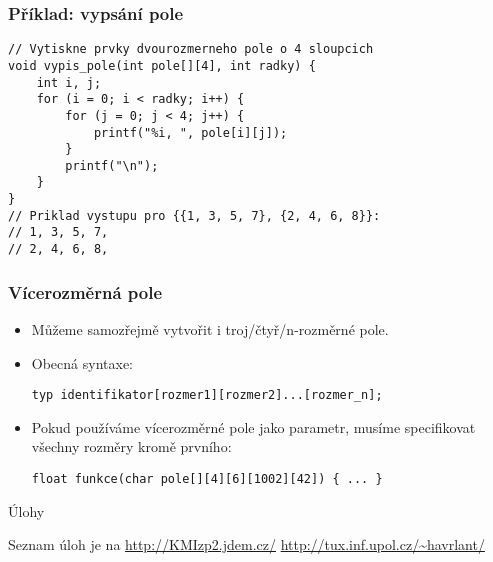 \documentclass{beamer}
\newenvironment{itemizex}%
  {\large \begin{itemize}%
    \setlength{\itemsep}{8pt}%
    \setlength{\parskip}{8pt}}%
  {\end{itemize}}
\begin{document}
\begin{frame}[t,fragile]\frametitle{Příklad: vypsání pole} 
\begin{verbatim} 
// Vytiskne prvky dvourozmerneho pole o 4 sloupcich
void vypis_pole(int pole[][4], int radky) {
    int i, j;
    for (i = 0; i < radky; i++) {
        for (j = 0; j < 4; j++) {
            printf("%i, ", pole[i][j]);
        }
        printf("\n");
    }
}
// Priklad vystupu pro {{1, 3, 5, 7}, {2, 4, 6, 8}}:
// 1, 3, 5, 7, 
// 2, 4, 6, 8, 
\end{verbatim}
\end{frame}



\begin{frame}[t,fragile]\frametitle{Vícerozměrná pole} 
    \vskip 1cm
    \begin{itemizex}
        \item Můžeme samozřejmě vytvořit i troj/čtyř/n-rozměrné pole.
        \item Obecná syntaxe:
\begin{verbatim} 
typ identifikator[rozmer1][rozmer2]...[rozmer_n];
\end{verbatim}
        \item Pokud používáme vícerozměrné pole jako parametr, musíme specifikovat všechny rozměry kromě prvního:
\begin{verbatim} 
float funkce(char pole[][4][6][1002][42]) { ... }
\end{verbatim}
    \end{itemizex}
\end{frame}


\begin{frame}[t,fragile]{Úlohy}
\begin{center}
\vskip 1cm
{\Large Seznam úloh je na \url{http://KMIzp2.jdem.cz/}}
\vskip 2cm
\url{http://tux.inf.upol.cz/~havrlant/}
\end{center}
\end{frame}
\end{document}

